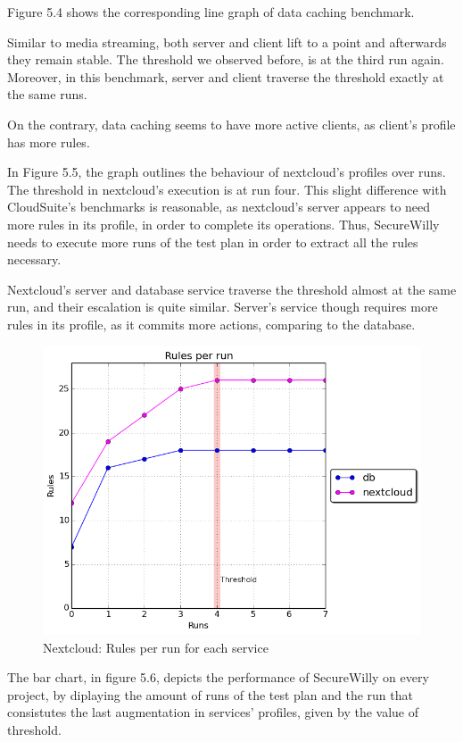 Figure 5.4 shows the corresponding line graph of data caching benchmark.

Similar to media streaming, both server and client lift to a point and afterwards they remain stable. The threshold we observed before, is at the third run again. Moreover, in this benchmark, server and client traverse the threshold exactly at the same runs.

On the contrary, data caching seems to have more active clients, as client's profile has more rules.

In Figure 5.5, the graph outlines the behaviour of nextcloud's profiles over runs. The threshold in nextcloud's execution is at run four. This slight difference with CloudSuite's benchmarks is reasonable, as nextcloud's server appears to need more rules in its profile, in order to complete its operations. Thus, SecureWilly needs to execute more runs of the test plan in order to extract all the rules necessary.

Nextcloud's server and database service traverse the threshold almost at the same run, and their escalation is quite similar. Server's service though requires more rules in its profile, as it commits more actions, comparing to the database.

\begin{figure}[h!]
  \centering
   \includegraphics[width=0.75\linewidth]{figures/nextcloud/rulesthreshold.png}
   \caption{Nextcloud: Rules per run for each service}
\end{figure}
\hfill\break

The bar chart, in figure 5.6, depicts the performance of SecureWilly on every project, by diplaying the amount of runs of the test plan and the run that consistutes the last augmentation in services' profiles, given by the value of threshold.

